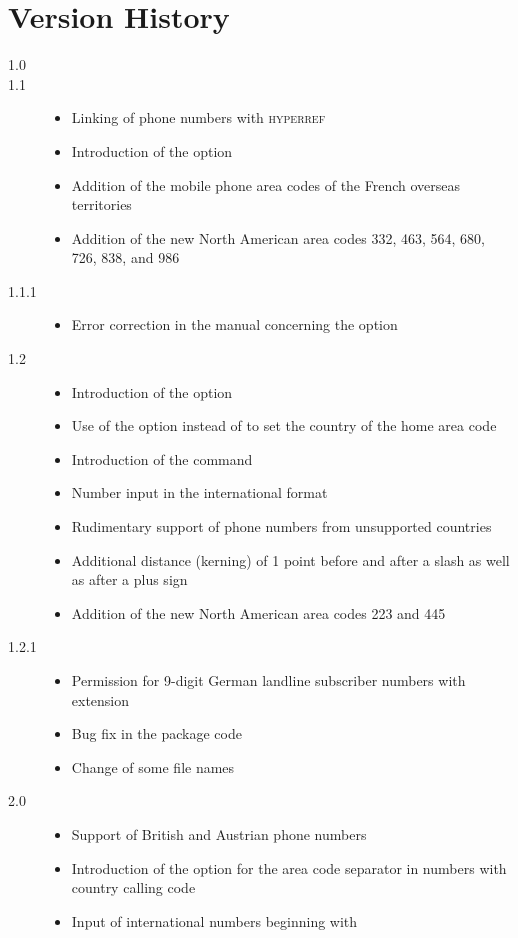 \documentclass[numbers=noenddot]{scrreprt}
\newcommand*\Paket[1]{\textsc{#1}}
\begin{document}
\chapter{Version History}
\small
\begin{description}
\item[1.0] 
\item[1.1] 
\begin{itemize}
\item Linking of phone numbers with \Paket{hyperref}
\item Introduction of the  option
\item Addition of the mobile phone area codes of the French overseas territories
\item Addition of the new North American area codes 332, 463, 564, 680, 726, 838, and 986
\end{itemize}
\item[1.1.1] 
\begin{itemize}
\item Error correction in the manual concerning the  option
\end{itemize}
\item[1.2] 
\begin{itemize}
\item Introduction of the
option
\item Use of the
option instead of
to set the country of the home area code
\item Introduction of the
 command
\item Number input in the international format
\item Rudimentary support of phone numbers from unsupported countries
\item Additional distance (kerning) of 1 point before and after a slash as well as after a plus sign
\item Addition of the new North American area codes 223 and 445
\end{itemize}
\item[1.2.1] 
\begin{itemize}
\item Permission for 9-digit German landline subscriber numbers with extension
\item Bug fix in the package code
\item Change of some file names
\end{itemize}
\item[2.0] 
\begin{itemize}
\item Support of British and Austrian phone numbers
\item Introduction of the
option for the area code separator in numbers with country calling code
\item Input of international numbers beginning with


\end{itemize}
\end{description}
\end{document}
